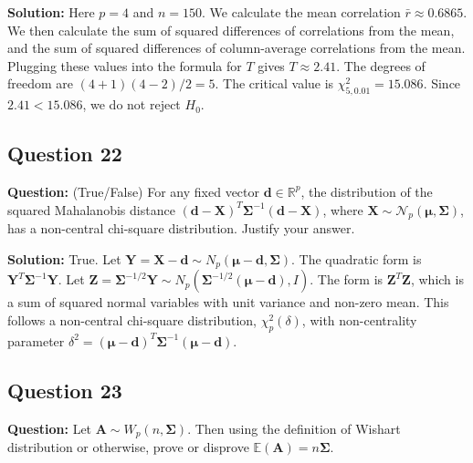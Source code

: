 \textbf{Solution:}
Here $p=4$ and $n=150$. We calculate the mean correlation $\bar{r} \approx 0.6865$. We then calculate the sum of squared differences of correlations from the mean, and the sum of squared differences of column-average correlations from the mean. Plugging these values into the formula for $T$ gives $T \approx 2.41$. The degrees of freedom are $(4+1)(4-2)/2 = 5$. The critical value is $\chi^2_{5, 0.01} = 15.086$. Since $2.41 < 15.086$, we do not reject $H_0$.

\subsection*{Question 22}
\textbf{Question:} (True/False) For any fixed vector $\mathbf{d} \in \mathbb{R}^p$, the distribution of the squared Mahalanobis distance $(\mathbf{d} - \mathbf{X})^T \boldsymbol{\Sigma}^{-1} (\mathbf{d} - \mathbf{X})$, where $\mathbf{X} \sim \mathcal{N}_p(\boldsymbol{\mu}, \boldsymbol{\Sigma})$, has a non-central chi-square distribution. Justify your answer.

\textbf{Solution:}
True. Let $\mathbf{Y} = \mathbf{X} - \mathbf{d} \sim N_p(\boldsymbol{\mu}-\mathbf{d}, \boldsymbol{\Sigma})$. The quadratic form is $\mathbf{Y}^T\boldsymbol{\Sigma}^{-1}\mathbf{Y}$. Let $\mathbf{Z} = \boldsymbol{\Sigma}^{-1/2}\mathbf{Y} \sim N_p(\boldsymbol{\Sigma}^{-1/2}(\boldsymbol{\mu}-\mathbf{d}), I)$. The form is $\mathbf{Z}^T\mathbf{Z}$, which is a sum of squared normal variables with unit variance and non-zero mean. This follows a non-central chi-square distribution, $\chi^2_p(\delta)$, with non-centrality parameter $\delta^2 = (\boldsymbol{\mu}-\mathbf{d})^T\boldsymbol{\Sigma}^{-1}(\boldsymbol{\mu}-\mathbf{d})$.

\subsection*{Question 23}
\textbf{Question:} Let $\mathbf{A} \sim W_p(n, \boldsymbol{\Sigma})$. Then using the definition of Wishart distribution or otherwise, prove or disprove $\mathbb{E}(\mathbf{A}) = n\boldsymbol{\Sigma}$.

